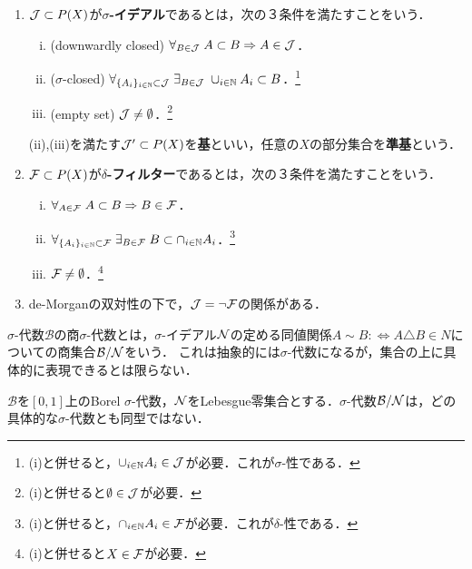\documentclass[uplatex, dvipdfmx]{jsreport}
\renewcommand{\B}{\mathcal{B}}
\begin{document}
\begin{definition}\mbox{}
    \begin{enumerate}
        \item $\mathcal{J}\subset P(X)$が\textbf{$\sigma$-イデアル}であるとは，次の３条件を満たすことをいう．
        \begin{enumerate}[(i)]
            \item (downwardly closed) $\forall_{B\in\mathcal{J}}\; A\subset B\Rightarrow A\in\mathcal{J}$．
            \item ($\sigma$-closed) $\forall_{\{A_i\}_{i\in\mathbb{N}}\subset\mathcal{J}}\;\exists_{B\in\mathcal{J}}\;\cup_{i\in\mathbb{N}}A_i\subset B$．\footnote{(i)と併せると，$\cup_{i\in\mathbb{N}}A_i\in\mathcal{J}$が必要．これが$\sigma$-性である．}
            \item (empty set) $\mathcal{J}\ne\emptyset$．\footnote{(i)と併せると$\emptyset\in\mathcal{J}$が必要．}
        \end{enumerate}
        (ii),(iii)を満たす$\mathcal{J}'\subset P(X)$を\textbf{基}といい，任意の$X$の部分集合を\textbf{準基}という．
        \item $\mathcal{F}\subset P(X)$が\textbf{$\delta$-フィルター}であるとは，次の３条件を満たすことをいう．
        \begin{enumerate}[(i)]
            \item $\forall_{A\in\mathcal{F}}\; A\subset B\Rightarrow B\in\mathcal{F}$．
            \item $\forall_{\{A_i\}_{i\in\mathbb{N}}\subset\mathcal{F}}\;\exists_{B\in\mathcal{F}}\;B\subset\cap_{i\in\mathbb{N}}A_i$．\footnote{(i)と併せると，$\cap_{i\in\mathbb{N}}A_i\in\mathcal{F}$が必要．これが$\delta$-性である．}
            \item $\mathcal{F}\ne\emptyset$．\footnote{(i)と併せると$X\in\mathcal{F}$が必要．}
        \end{enumerate}
        \item de-Morganの双対性の下で，$\mathcal{J}=\lnot\mathcal{F}$の関係がある．
    \end{enumerate}
\end{definition}

\begin{definition}
    $\sigma$-代数$\B$の商$\sigma$-代数とは，$\sigma$-イデアル$\mathcal{N}$の定める同値関係$A\sim B:\Leftrightarrow A\triangle B\in N$についての商集合$\B/\cN$をいう．
    これは抽象的には$\sigma$-代数になるが，集合の上に具体的に表現できるとは限らない．
\end{definition}
\begin{example}
    $\B$を$[0,1]$上のBorel $\sigma$-代数，$\mathcal{N}$をLebesgue零集合とする．$\sigma$-代数$\B/\cN$は，どの具体的な$\sigma$-代数とも同型ではない．
\end{example}
\end{document}
